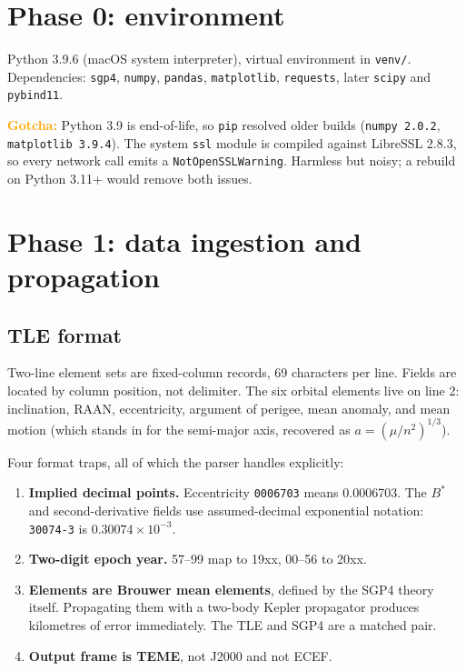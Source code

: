 \documentclass[11pt]{article}
\newcommand{\gotcha}[1]{\textcolor{orange}{\textbf{Gotcha:}} #1}
\begin{document}
\section{Phase 0: environment}\label{sec:phase0}

Python \num{3.9.6} (macOS system interpreter), virtual environment in
\texttt{venv/}. Dependencies: \texttt{sgp4}, \texttt{numpy},
\texttt{pandas}, \texttt{matplotlib}, \texttt{requests}, later
\texttt{scipy} and \texttt{pybind11}.

\gotcha{Python 3.9 is end-of-life, so \texttt{pip} resolved older builds
(\texttt{numpy 2.0.2}, \texttt{matplotlib 3.9.4}). The system \texttt{ssl}
module is compiled against LibreSSL 2.8.3, so every network call emits a
\texttt{NotOpenSSLWarning}. Harmless but noisy; a rebuild on Python
3.11+ would remove both issues.}

\section{Phase 1: data ingestion and propagation}\label{sec:phase1}

\subsection{TLE format}

Two-line element sets are fixed-column records, 69 characters per line.
Fields are located by column position, not delimiter. The six orbital
elements live on line 2: inclination, RAAN, eccentricity, argument of
perigee, mean anomaly, and mean motion (which stands in for the
semi-major axis, recovered as $a = (\mu/n^2)^{1/3}$).

Four format traps, all of which the parser handles explicitly:
\begin{enumerate}
  \item \textbf{Implied decimal points.} Eccentricity \texttt{0006703}
        means \num{0.0006703}. The $B^*$ and second-derivative fields use
        assumed-decimal exponential notation: \texttt{30074-3} is
        $0.30074\times10^{-3}$.
  \item \textbf{Two-digit epoch year.} 57--99 map to 19xx, 00--56 to 20xx.
  \item \textbf{Elements are Brouwer mean elements}, defined by the SGP4
        theory itself. Propagating them with a two-body Kepler propagator
        produces kilometres of error immediately. The TLE and SGP4 are a
        matched pair.
  \item \textbf{Output frame is TEME}, not J2000 and not ECEF.
\end{enumerate}
\end{document}

